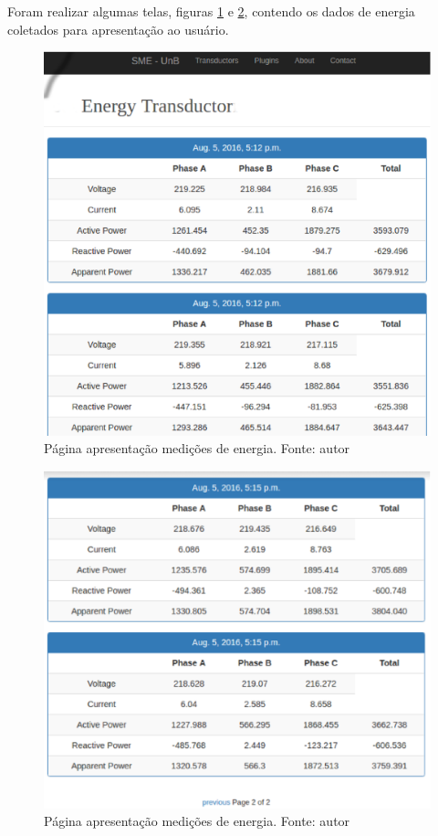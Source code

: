 \vfill
\pagebreak

Foram realizar algumas telas, figuras \ref{dados01} e \ref{dados02}, contendo os dados de energia coletados para apresentação ao usuário.

\begin{figure}[!htpb]
    \centering
    \includegraphics[keepaspectratio=true,scale=0.5]{figuras/coleta_dados_01.eps}
    \caption{Página apresentação medições de energia. Fonte: autor}
    \label{dados01}
\end{figure}

\begin{figure}[!htpb]
    \centering
    \includegraphics[keepaspectratio=true,scale=0.5]{figuras/coleta_dados_02.eps}
    \caption{Página apresentação medições de energia. Fonte: autor}
    \label{dados02}
\end{figure}

